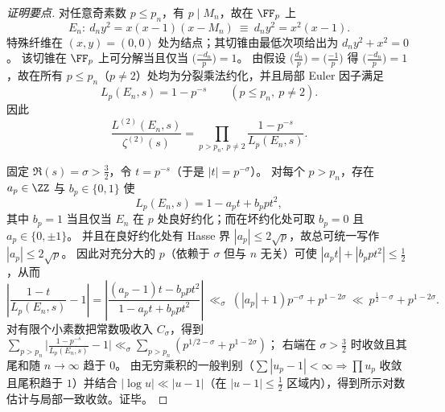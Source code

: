 \begin{proof}[证明要点]
对任意奇素数 \(p\le p_n\)，有 \(p\mid M_n\)，故在 \(\FF_p\) 上
\[
E_n:\ d_n y^2=x(x-1)(x-M_n)\ \equiv\ d_n y^2=x^2(x-1).
\]
特殊纤维在 \((x,y)=(0,0)\) 处为结点；其切锥由最低次项给出为 \(d_n y^2+x^2=0\)。
该切锥在 \(\FF_p\) 上可分解当且仅当 \(\bigl(\frac{-d_n}{p}\bigr)=1\)。
由假设 \(\bigl(\frac{d_n}{p}\bigr)=\bigl(\frac{-1}{p}\bigr)\) 得 \(\bigl(\frac{-d_n}{p}\bigr)=1\)，故在所有 \(p\le p_n\)（\(p\neq 2\)）处均为分裂乘法约化，并且局部 Euler 因子满足
\[
L_p(E_n,s)=1-p^{-s}\qquad(p\le p_n,\ p\neq 2).
\]
因此
\[
\frac{L^{(2)}(E_n,s)}{\zeta^{(2)}(s)}
=\prod_{p>p_n,\ p\neq 2}\frac{1-p^{-s}}{L_p(E_n,s)}.
\]
\par
固定 \(\Re(s)=\sigma>\tfrac32\)，令 \(t=p^{-s}\)（于是 \(|t|=p^{-\sigma}\)）。
对每个 \(p>p_n\)，存在 \(a_p\in\ZZ\) 与 \(b_p\in\{0,1\}\) 使
\[
L_p(E_n,s)=1-a_p t+b_p pt^2,
\]
其中 \(b_p=1\) 当且仅当 \(E_n\) 在 \(p\) 处良好约化；而在坏约化处可取 \(b_p=0\) 且 \(a_p\in\{0,\pm1\}\)。
并且在良好约化处有 Hasse 界 \(|a_p|\le 2\sqrt p\)，故总可统一写作 \(|a_p|\le 2\sqrt p\)。
因此对充分大的 \(p\)（依赖于 \(\sigma\) 但与 \(n\) 无关）可使 \(|a_p t|+|b_p pt^2|\le\tfrac12\)，从而
\[
\left|\frac{1-t}{L_p(E_n,s)}-1\right|
=\left|\frac{(a_p-1)t-b_p pt^2}{1-a_pt+b_p pt^2}\right|
\ \ll_\sigma\ (|a_p|+1)p^{-\sigma}+p^{1-2\sigma}
\ \ll\ p^{\frac12-\sigma}+p^{1-2\sigma}.
\]
对有限个小素数把常数吸收入 \(C_\sigma\)，得到
\(
\sum_{p>p_n}\bigl|\frac{1-p^{-s}}{L_p(E_n,s)}-1\bigr|
\ll_\sigma
\sum_{p>p_n}(p^{1/2-\sigma}+p^{1-2\sigma})
\)；
右端在 \(\sigma>\tfrac32\) 时收敛且其尾和随 \(n\to\infty\) 趋于 \(0\)。
由无穷乘积的一般判别（\(\sum|u_p-1|<\infty\Rightarrow\prod u_p\) 收敛且尾积趋于 \(1\)）并结合 \(|\log u|\ll|u-1|\)（在 \(|u-1|\le\tfrac12\) 区域内），得到所示对数估计与局部一致收敛。证毕。
\end{proof}


